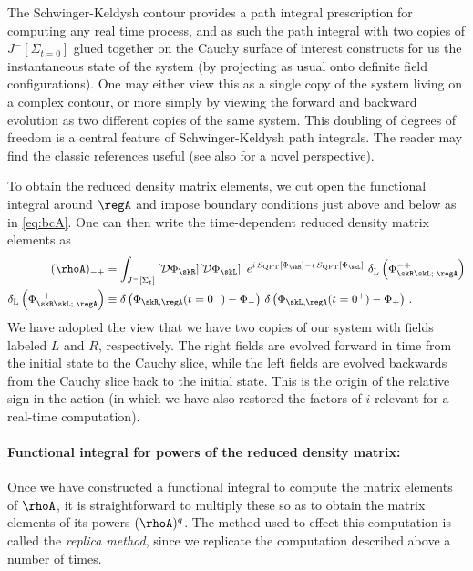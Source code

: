 \documentclass[12pt,openany]{book}
\begin{document}
The Schwinger-Keldysh contour provides a path integral prescription for computing any real time process, and as such the path integral with two copies of $J^-[\Sigma_{t=0}]$ glued together on the Cauchy surface of interest constructs for us the instantaneous state of the system (by projecting as usual onto definite field configurations). One may either view this as a single copy of the system living on a complex contour, or more simply by viewing the forward and backward evolution as two different copies of the same system. This doubling of degrees of freedom is a central feature of Schwinger-Keldysh path integrals. The reader may find the classic references \cite{Chou:1984es,Landsman:1986uw} useful (see also \cite{Haehl:2015foa,Haehl:2016pec} for a novel perspective).

 To obtain the reduced density matrix elements, we cut open the functional integral around $\regA$ and impose boundary conditions just above and below as in \eqref{eq:bcA}. One can then write the time-dependent reduced density matrix elements as
\begin{align}
(\rhoA)_{-+} &= \int_{J^-[\Sigma_t]} \, [{\cal D} \Phi_\skR] [{\cal D} \Phi_\skL] \, \  e^{i\, S_\text{QFT}[\Phi_\skR] - i\,S_\text{QFT}[\Phi_\skL]}  \ \delta_\text{L}\left(\Phi_{\skR\skL;\; \regA}^{-+} \right)
\nonumber \\
\delta_\text{L}\left(\Phi_{\skR\skL;\;  \regA}^{-+} \right) & \equiv
 \delta\left(\Phi_{\skR,\regA} (t=0^-) -  \Phi_- \right)\, \delta\left(\Phi_{\skL,\regA} (t=0^+)- \Phi_+ \right) \,.
\label{eq:rhoAL}
\end{align}
%
We have adopted the view that we have two copies of  our system with fields labeled $L$ and $R$, respectively. The right fields are evolved forward in time from the initial state to the Cauchy slice, while the left fields are evolved backwards from the Cauchy slice back to the initial state. This is the origin of the relative sign in the action (in which we have also restored the factors of $i$ relevant for a real-time computation).

\paragraph{Functional integral for powers of the reduced density matrix:} Once we have constructed a functional integral to compute the matrix elements of $\rhoA$, it is straightforward to multiply these so  as to obtain the matrix elements of its powers
$(\rhoA)^q$. The method used to effect this computation is called the {\em replica method}, since we replicate the computation described above a number of times.
\end{document}
